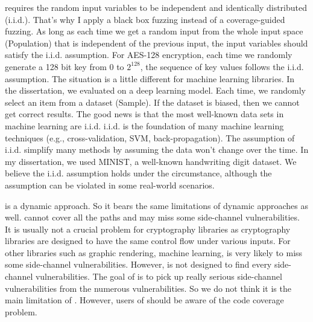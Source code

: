 \ctool{} requires the random input variables to be independent and identically distributed (i.i.d.). That's why I apply a black box fuzzing instead of a coverage-guided fuzzing. As long as each time we get a random input from the whole input space (Population) that is independent of the previous input, the input variables should satisfy the i.i.d. assumption. For AES-128 encryption, each time we randomly generate a 128 bit key from $0$ to $2^{128}$, the sequence of key values follows the i.i.d. assumption. The situation is a little different for machine learning libraries. In the dissertation, we evaluated \ctool{} on a deep learning model. Each time, we randomly select an item from a dataset (Sample). If the dataset is biased, then we cannot get correct results. The good news is that the most well-known data sets in
machine learning are i.i.d. i.i.d. is the foundation of many machine learning
techniques (e.g., cross-validation, SVM, back-propagation). The assumption of i.i.d. 
simplify many methods by assuming the data won't change over the time. 
In my dissertation, we used MINIST, a well-known handwriting digit dataset. 
We believe the i.i.d. assumption holds under the circumstance, although the
assumption can be violated in some real-world scenarios.


\ctool{} is a dynamic approach. So it bears the same limitations of dynamic approaches as well. \ctool{} cannot cover all the paths and may miss some side-channel vulnerabilities. It is usually not a crucial problem for cryptography libraries as cryptography libraries are designed to have the same control flow under various inputs. For other libraries such as graphic rendering, machine learning, \ctool{} is very likely to miss some side-channel vulnerabilities. However, \ctool{} is not designed to find every side-channel vulnerabilities. The goal of \ctool{} is to pick up really serious side-channel vulnerabilities from the numerous vulnerabilities. So we do not think it is the main limitation of \ctool{}. However, users of \ctool{} should be aware of the code coverage problem. 

